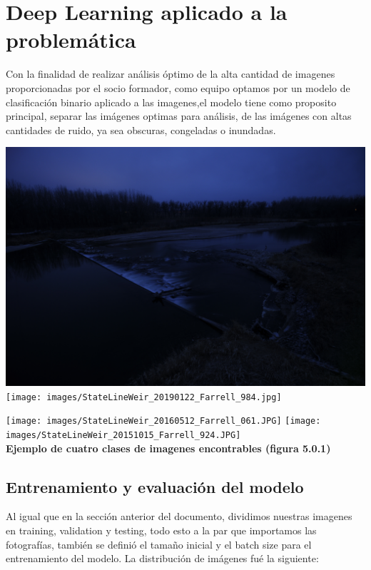 \documentclass{article}
\begin{document}
\section{Deep Learning aplicado a la problemática}

Con la finalidad de realizar análisis óptimo de la alta cantidad de imagenes proporcionadas por el socio formador, como equipo optamos por un modelo de clasificación binario aplicado a las imagenes,el modelo tiene como proposito principal, separar las imágenes optimas para análisis, de las imágenes con altas cantidades de ruido, ya sea obscuras, congeladas o inundadas.\\  

    \begin{center}
            \includegraphics[scale=0.1]{images/StateLineWeir_20190116_Farrell_805.jpg} 
            \texttt{[image: images/StateLineWeir\_20190122\_Farrell\_984.jpg]} \\
    \end{center}
    \begin{center}
            \texttt{[image: images/StateLineWeir\_20160512\_Farrell\_061.JPG]} 
            \texttt{[image: images/StateLineWeir\_20151015\_Farrell\_924.JPG]} \\
        \textbf{Ejemplo de cuatro clases de imagenes encontrables (figura 5.0.1)} 
    \end{center}

    \subsection{Entrenamiento y evaluación del modelo }
    
        Al igual que en la sección anterior del documento, dividimos nuestras imagenes en training, validation y testing, todo esto a la par que importamos las fotografías, también se definió el tamaño inicial y el batch size para el entrenamiento del modelo. La distribución de imágenes fué la siguiente: 
        
\end{document}
